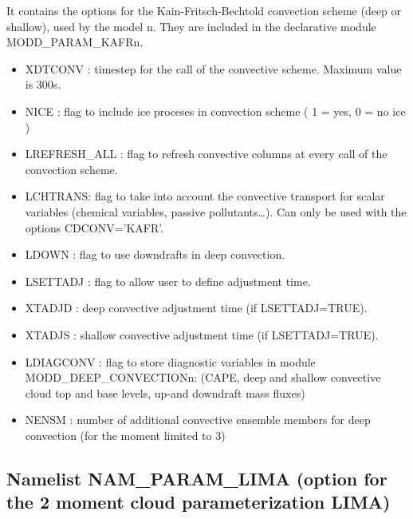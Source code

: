 It contains the options  for the Kain-Fritsch-Bechtold convection scheme (deep or shallow), used
by the  model n. They are included in the declarative module
MODD\_PARAM\_KAFRn.
\begin{itemize}
\item
{}
XDTCONV : timestep for the call of the convective scheme. Maximum value is 300s. 
\item
{}
NICE : flag to include ice proceses in convection scheme
( 1 = yes, 0 = no ice )
\item
{}
LREFRESH\_ALL : flag to refresh convective columns at every call of the
convection scheme.
\item
{}
LCHTRANS: flag to take into account the convective transport for
scalar variables (chemical variables, passive pollutants\ldots).
Can only be used with the options CDCONV='KAFR'.
\item
{}
LDOWN : flag to use downdrafts in deep convection.
\item
{}
LSETTADJ : flag to allow user to define adjustment time.
\item
{}
XTADJD : deep convective adjustment time (if LSETTADJ=TRUE).
\item
{}
XTADJS : shallow convective adjustment time (if LSETTADJ=TRUE).
\item
{}
LDIAGCONV : flag to store diagnostic variables in module MODD\_DEEP\_CONVECTIONn:
(CAPE, deep and shallow convective cloud top and base levels, up-and downdraft mass fluxes)
\item
{}
NENSM : number of additional convective ensemble members for deep convection
(for the moment limited to 3)
\end{itemize}
\subsection{Namelist NAM\_PARAM\_LIMA (option for the 2 moment cloud 
parameterization LIMA)}

